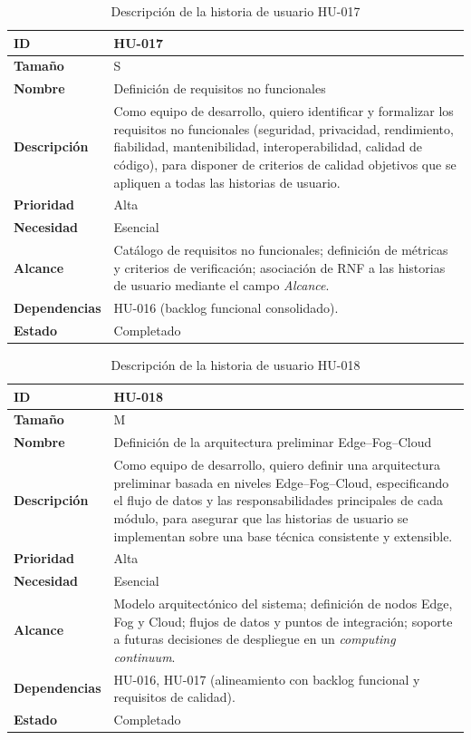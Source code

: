 \documentclass{report}
\begin{document}
\begin{table}[H]
\centering
\caption{Descripción de la historia de usuario HU-017}
\label{tab:hu017}
\begin{tabular}{|l|p{12cm}|}
\hline
\textbf{ID} & HU-017 \\ \hline
\textbf{Tamaño} & S \\ \hline
\textbf{Nombre} & Definición de requisitos no funcionales \\ \hline
\textbf{Descripción} & 
Como equipo de desarrollo, quiero identificar y formalizar los requisitos no funcionales (seguridad, privacidad, rendimiento, fiabilidad, mantenibilidad, interoperabilidad, calidad de código), para disponer de criterios de calidad objetivos que se apliquen a todas las historias de usuario. \\ \hline
\textbf{Prioridad} & Alta \\ \hline
\textbf{Necesidad} & Esencial \\ \hline
\textbf{Alcance} & Catálogo de requisitos no funcionales; definición de métricas y criterios de verificación; asociación de RNF a las historias de usuario mediante el campo \emph{Alcance}. \\ \hline
\textbf{Dependencias} & HU-016 (backlog funcional consolidado). \\ \hline
\textbf{Estado} & Completado \\ \hline
\end{tabular}
\end{table}



\begin{table}[H]
\centering
\caption{Descripción de la historia de usuario HU-018}
\label{tab:hu018}
\begin{tabular}{|l|p{12cm}|}
\hline
\textbf{ID} & HU-018 \\ \hline
\textbf{Tamaño} & M \\ \hline
\textbf{Nombre} & Definición de la arquitectura preliminar Edge--Fog--Cloud \\ \hline
\textbf{Descripción} & 
Como equipo de desarrollo, quiero definir una arquitectura preliminar basada en niveles Edge--Fog--Cloud, especificando el flujo de datos y las responsabilidades principales de cada módulo, para asegurar que las historias de usuario se implementan sobre una base técnica consistente y extensible. \\ \hline
\textbf{Prioridad} & Alta \\ \hline
\textbf{Necesidad} & Esencial \\ \hline
\textbf{Alcance} & Modelo arquitectónico del sistema; definición de nodos Edge, Fog y Cloud; flujos de datos y puntos de integración; soporte a futuras decisiones de despliegue en un \textit{computing continuum}. \\ \hline
\textbf{Dependencias} & HU-016, HU-017 (alineamiento con backlog funcional y requisitos de calidad). \\ \hline
\textbf{Estado} & Completado \\ \hline
\end{tabular}
\end{table}
\end{document}
